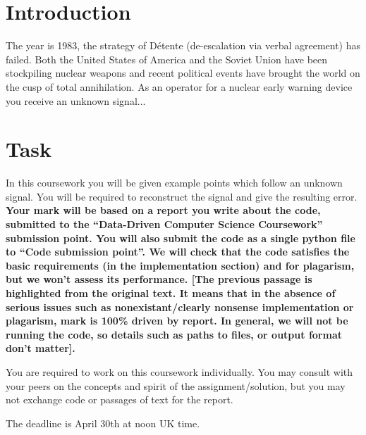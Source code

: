 \documentclass[10pt]{article}
\date{}
\author{Originally by: Michael Wray \& Davide Moltisanti}
\begin{document}
\maketitle

\section{Introduction}
\label{sec:intro}
The year is 1983, the strategy of D\'etente (de-escalation via verbal agreement) has failed.
Both the United States of America and the Soviet Union have been stockpiling nuclear weapons and recent political events have brought the world on the cusp of total annihilation.
As an operator for a nuclear early warning device you receive an unknown signal... 

\section{Task}
\label{sec:task}
In this coursework you will be given example points which follow an unknown signal.
You will be required to reconstruct the signal and give the resulting error.
\textbf{Your mark will be based on a report you write about the code, submitted to the ``Data-Driven Computer Science Coursework'' submission point.
You will also submit the code as a single python file to ``Code submission point''.  
We will check that the code satisfies the basic requirements (in the implementation section) and for plagarism, but we won't assess its performance. [The previous passage is highlighted from the original text. It means that in the absence of serious issues such as nonexistant/clearly nonsense implementation or plagarism, mark is 100\% driven by report.  In general, we will not be running the code, so details such as paths to files, or output format don't matter].}

You are required to work on this coursework individually. You may consult with your peers on the concepts and spirit of the assignment/solution, but you may not exchange code or passages of text for the report.

The deadline is April 30th at noon UK time.
\end{document}
